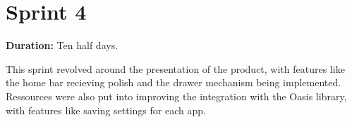 \section{Sprint 4}%

\textbf{Duration:} Ten half days. \newline

This sprint revolved around the presentation of the product, with features like the home bar recieving polish and the drawer mechanism being implemented. 
Ressources were also put into improving the integration with the Oasis library, with features like saving settings for each app. 